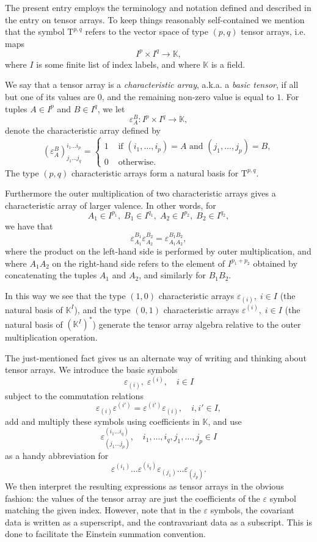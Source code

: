 \documentclass[12pt]{article}
\newcommand{\kfield}{\mathbb{K}}
\newcommand{\rT}{\mathrm{T}}
\newcommand{\tspace}[1]{\rT^{#1}}
\newcommand{\ca}{\varepsilon}
\newcommand{\lp}{\left(}
\newcommand{\rp}{\right)}
\begin{document}
The present entry employs the terminology and notation defined and
described in the entry on tensor arrays.  To keep things reasonably
self-contained we mention that the symbol $\tspace{p,q}$ refers to the
vector space of type $(p,q)$ tensor arrays, i.e. maps $$I^p\times I^q\rightarrow \kfield,$$ where $I$ is some finite list of
index labels, and where $\kfield$ is a field.  

We say that a tensor array is a {\em characteristic array}, a.k.a. a
{\em basic tensor}, if all but one of its values are $0$, and the
remaining non-zero value is equal to $1$.  For tuples $A\in I^p$ and
$B\in I^q$, we let
$$\ca^B_A:I^p\times I^q\rightarrow\kfield,$$
denote the characteristic
array defined by
$$(\ca^B_A)^{i_1\ldots i_p}_{j_1\ldots j_q} = 
\left\{ 
  \begin{array}{rl}
    1 & \mbox{ if $(i_1,\ldots,i_p) = A$ and $(j_1,\ldots, j_p)=B$},\\
    0 & \mbox{ otherwise.}
  \end{array}
  \right.
$$
The type $(p,q)$ characteristic arrays form a natural basis for
$\tspace{p,q}$.  

Furthermore the outer multiplication of two characteristic arrays
gives a characteristic array of larger valence.  In other words, for
$$
A_1\in I^{p_1},\;
B_1\in I^{q_1},\;
A_2\in I^{p_2},\;
B_2\in I^{q_2},
$$
we have that
$$\ca^{B_1}_{A_1} \ca^{B_2}_{A_2} = \ca^{B_1 B_2}_{A_1 A_2},$$
where
the product on the left-hand side is performed by outer
multiplication, and where $A_1 A_2$ on the right-hand side refers to
the element of $I^{p_1+p_2}$ obtained by concatenating the tuples
$A_1$ and $A_2$, and similarly for $B_1 B_2$.

In this way we see that the type $(1,0)$ characteristic arrays
$\ca_{(i)},\; i\in I$ (the natural basis of $\kfield^I$), and the type
$(0,1)$ characteristic arrays $\ca^{(i)},\; i\in I$ (the natural basis of
$\lp\kfield^I\rp^*$) generate the tensor array algebra relative to the
outer multiplication operation.  

The just-mentioned fact gives us an alternate way of writing and
thinking about tensor arrays.  We introduce the basic symbols
$$\ca_{(i)},\; \ca^{(i)} ,\quad i\in I$$
subject to the commutation relations
$$\ca_{(i)} \ca^{(i')} = \ca^{(i')}\ca_{(i)} ,\quad i, i'\in I,$$
 add and multiply these symbols using coefficients in
$\kfield$, and use
$$\ca^{(i_1 \ldots i_q)}_{(j_1 \ldots j_p)},\quad
i_1,\ldots,i_q,j_1,\ldots,j_p\in I$$ 
as a handy abbreviation for
$$\ca^{(i_1)} \ldots \ca^{(i_q)} \ca_{(j_1)} \ldots \ca_{(j_p)}.$$
We
then interpret the resulting expressions as tensor arrays in the
obvious fashion: the values of the tensor array are just the
coefficients of the $\ca$ symbol matching the given index.  However,
note that in the $\ca$ symbols, the covariant data is written as a
superscript, and the contravariant data as a subscript.  This is done
to facilitate the Einstein summation convention.
\end{document}
